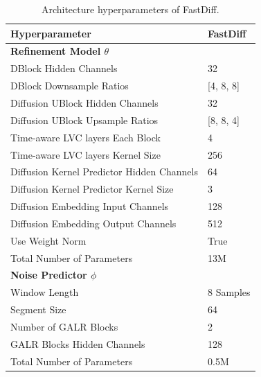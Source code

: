 \begin{table}[h]
\centering
\begin{minipage}[t]{\linewidth}
\centering
\begin{tabular}{l|l}
\hline
\textbf{Hyperparameter}               &  \textbf{FastDiff}  \\
\toprule
\textbf{Refinement Model $\theta$}    &               \\
DBlock Hidden Channels                 &     32     \\ 
DBlock Downsample Ratios               &  [4, 8, 8]           \\ 
Diffusion UBlock Hidden Channels      &    32          \\
Diffusion UBlock Upsample Ratios       &    [8, 8, 4]    \\
Time-aware LVC layers Each Block       &      4         \\
Time-aware LVC layers Kernel Size      &      256       \\
Diffusion Kernel Predictor Hidden Channels   &       64   \\  
Diffusion Kernel Predictor Kernel Size  &      3       \\
Diffusion Embedding Input Channels      &      128     \\
Diffusion Embedding Output Channels     &      512     \\
Use Weight Norm                         &      True          \\
\midrule
Total Number of Parameters             &           13M	         \\ 
\midrule
\textbf{Noise Predictor $\phi$}      &               \\
Window Length                       &  8 Samples             \\
Segment Size                        &  64             \\
Number of GALR Blocks               &  2             \\
GALR Blocks Hidden Channels         &  128             \\
\midrule
Total Number of Parameters          &   0.5M         \\ 
\bottomrule
\end{tabular}
\caption{Architecture hyperparameters of FastDiff.}
\label{tab:hyperparameters}
\end{minipage}
\end{table}





